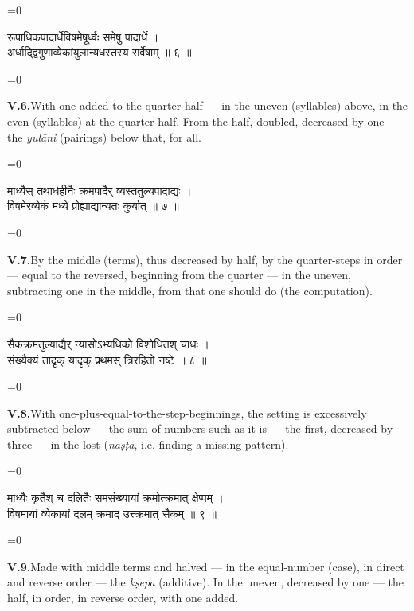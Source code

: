\documentclass[11pt,a4paper]{article}
\newcommand{\dev}[1]{{\devanagarifont\color{sktcolor}#1}}
\newcommand{\iast}[1]{\textit{#1}}
\newenvironment{paracol}[1]{\begingroup}{\endgroup}
\newcommand{\switchcolumn}[1][]{%
  \ifnum#1=0\relax\else\par\nobreak\vspace{0.5em}\par\nobreak\fi%
}
\begin{document}
\vspace{0.3cm}

\begin{paracol}{2}
\switchcolumn[0]
\dev{%
रूपाधिकपादार्धेविषमेषूर्ध्वः समेषु पादार्धे ।\\
अर्धाद्द्विगुणाव्येकांयुलान्यधस्तस्य सर्वेषाम् ॥ ६ ॥
}

\switchcolumn[1]
\textbf{V.6.}\quad With one added to the quarter-half — in the
uneven (syllables) above, in the even (syllables) at the
quarter-half. From the half, doubled, decreased by one — the
\iast{yulāni} (pairings) below that, for all.
\end{paracol}

\vspace{0.3cm}

\begin{paracol}{2}
\switchcolumn[0]
\dev{%
माध्यैस् तथार्धहीनैः क्रमपादैर् व्यस्ततुल्यपादाद्यः ।\\
विषमेरव्येकं मध्ये प्रोह्याद्यान्यतः कुर्यात् ॥ ७ ॥
}

\switchcolumn[1]
\textbf{V.7.}\quad By the middle (terms), thus decreased by half,
by the quarter-steps in order — equal to the reversed, beginning
from the quarter — in the uneven, subtracting one in the middle,
from that one should do (the computation).
\end{paracol}

\vspace{0.3cm}

\begin{paracol}{2}
\switchcolumn[0]
\dev{%
सैकक्रमतुल्याद्यैर् न्यासोऽभ्यधिको विशोधितश् चाधः ।\\
संख्यैक्यं तादृक् यादृक् प्रथमस् त्रिरहितो नष्टे ॥ ८ ॥
}

\switchcolumn[1]
\textbf{V.8.}\quad With one-plus-equal-to-the-step-beginnings, the
setting is excessively subtracted below — the sum of numbers
such as it is — the first, decreased by three — in the lost
(\iast{naṣṭa}, i.e. finding a missing pattern).
\end{paracol}

\vspace{0.3cm}

\begin{paracol}{2}
\switchcolumn[0]
\dev{%
माध्यैः कृतैश् च दलितैः समसंख्यायां क्रमोत्क्रमात् क्षेप्पम् ।\\
विषमायां व्येकायां दलम् क्रमाद् उत्त्क्रमात् सैकम् ॥ ९ ॥
}

\switchcolumn[1]
\textbf{V.9.}\quad Made with middle terms and halved — in the
equal-number (case), in direct and reverse order — the
\iast{kṣepa} (additive). In the uneven, decreased by one — the
half, in order, in reverse order, with one added.
\end{paracol}
\end{document}
